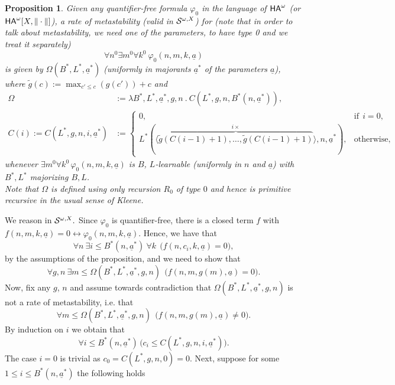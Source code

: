 \documentclass[1p]{elsarticle}
\newcommand{\usftext}[1]{\textsf{\upshape #1}}
\newcommand{\ha}{\ensuremath{{\usftext{HA}}^\omega}} %
\newcommand{\Tif}{\text{if}\ }
\newcommand{\Telse}{\text{otherwise}}
\theoremstyle{plain}
\newtheorem{prop}[thm]{Proposition}
\theoremstyle{definition}
\theoremstyle{remark}
\renewenvironment{proof}[1][]{\noindent{\bf Proof{#1}. }}{\nopagebreak[4]{\hspace*{\fill}
  $\Box$              %
 }{\vspace{2ex}}}
\renewcommand{\phi}{\varphi}
\theoremstyle{definition}
\begin{document}
{\begin{prop}\label{p:bg2meta}
Given any quantifier-free formula $\phi_0$ in the language of $\ha$ (or $\ha[X,\|\cdot\|]$), a rate of metastability (valid in ${\cal S}^{\omega,X}$) for (note that in order to talk about metastability, we need  one of the parameters, to have type 0 and we treat it separately) 
\[
\forall n^0 \exists m^0 \forall k^0\ \phi_0(n,m,k,\underline{a})\tag{$\phi$}\label{e:phi}
\]
is given by $\Omega(B^*,L^*,\underline{a}^*)$ 
(uniformly in majorants $\underline{a}^*$ of 
the parameters $\underline{a}$), where $\tilde g(c):=\max_{c'\leq c}(g(c'))+c$ and
\begin{align*} 
  \Omega&:=\lambda B^*,L^*,\underline{a}^*,g,n\ .\ C(L^*,g,n,
B^*(n,\underline{a}^*)),\\
C(i):=C(L^*,g,n,i,\underline{a}^*)&:=
\begin{cases}0,&\Tif\ i=0,\\ L^*(\langle\overbrace{ \tilde g(C(i-1)+1),\ldots,\tilde g(C(i-1)+1) }^{i\times}\rangle,n,\underline{a}^*),&\Telse,\end{cases}
\end{align*}
whenever $\exists m^0\forall k^0\,\varphi_0(n,m,k,\underline{a})$ 
is $B$, $L$-learnable 
(uniformly in $n$ and  $\underline{a}$) with $B^*,L^*$ majorizing 
$B,L$. \\ 
Note that $\Omega$ is defined using only recursion $R_0$ of type $0$ and 
hence is primitive recursive in the usual sense of Kleene.
\end{prop}
\begin{proof} We reason in ${\cal S}^{\omega,X}.$
Since $\phi_0$ is quantifier-free, there is a closed term $f$ with 
$f(n,m,k,\underline{a})=0\leftrightarrow \phi_0(n,m,k,\underline{a})$. 
Hence, we have that
\[ \forall n\ \exists i\leq B^*(n,\underline{a}^*)\ \forall k\ \ \big( 
f(n,c_i,k,\underline{a})=0 \big), \]
by the assumptions of the proposition, and we need to show that
\[ \forall g,n\ \exists m\leq \Omega(B^*,L^*,\underline{a}^*,g,n) 
\ \ \big( f(n,m,g(m),\underline{a})=0 \big). \]
Now, fix any $g$, $n$ and assume towards contradiction that 
$\Omega(B^*,L^*,\underline{a}^*,g,n)$ is not a rate of metastability, i.e. that
\[ \forall m\leq \Omega(B^*,L^*,\underline{a}^*,g,n)  \ \ \big( 
f(n,m,g(m),\underline{a})\neq0 \big). \tag{NE}\label{e:NE}\]
By induction on $i$ we obtain that
\[ \forall i\leq B^*(n,\underline{a}^*) \,\big(c_i\leq C(L^*,g,n,i,\underline{a}^*)
\big).\tag{IC}\label{e:IC} \]
The case $i=0$ is trivial as $c_0=C(L^*,g,n,0)=0$. Next, suppose for some $1\leq i\leq B^*(n,\underline{a}^*)$ the following holds

\end{proof}}
\end{document}
